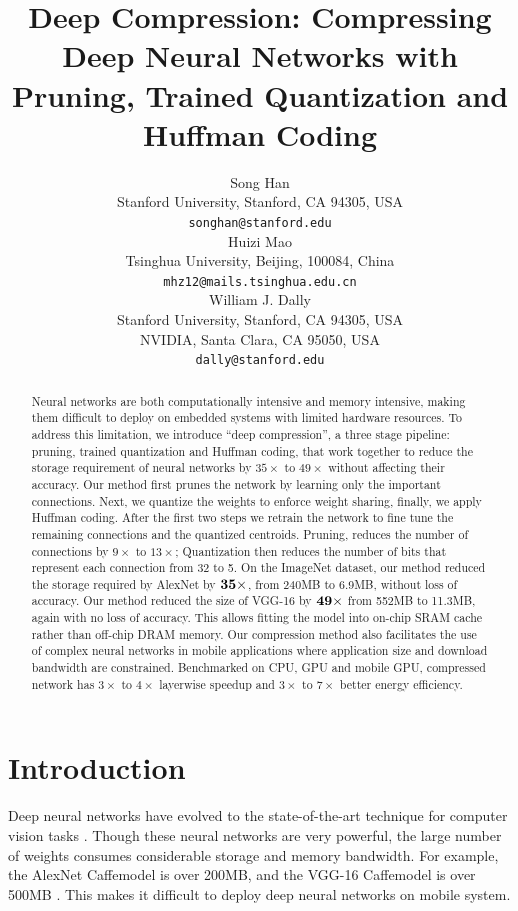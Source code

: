 \documentclass{article} %
\title{Deep Compression: Compressing Deep Neural Networks with Pruning, Trained Quantization and Huffman Coding}
\author{Song Han \\
Stanford University, Stanford, CA 94305, USA \\
\texttt{songhan@stanford.edu} \\
\AND
Huizi Mao \\
Tsinghua University, Beijing, 100084, China \\
\texttt{mhz12@mails.tsinghua.edu.cn} \\
\AND
William J. Dally \\
Stanford University, Stanford, CA 94305, USA \\
NVIDIA, Santa Clara, CA 95050, USA\\
\texttt{dally@stanford.edu} \\}
\begin{document}
\maketitle


\begin{abstract}
Neural networks are both computationally intensive and memory intensive, making them difficult to deploy on embedded systems with limited hardware resources. To address this limitation, we introduce ``deep compression'', a three stage pipeline: pruning, trained quantization and Huffman coding, that work together to reduce the storage requirement of neural networks by $35\times$ to $49\times$ without affecting their accuracy. 
Our method first prunes the network by learning only the important connections. Next, we quantize the weights to enforce weight sharing, finally, we apply Huffman coding. After the first two steps we retrain the network to fine tune the remaining connections and the quantized centroids. Pruning, reduces the number of connections by $9\times$ to $13\times$;   Quantization then reduces the number of bits that represent each connection from 32 to 5.  On the ImageNet dataset, our method reduced the storage required by AlexNet by $\bf{35\times}$, from 240MB to 6.9MB, without loss of accuracy. Our method reduced the size of VGG-16 by $\bf{49\times}$ from 552MB to 11.3MB, again with no loss of accuracy. This allows fitting the model into on-chip SRAM cache rather than off-chip DRAM memory. Our compression method also facilitates the use of complex neural networks in mobile applications where application size and download bandwidth are constrained. Benchmarked on CPU, GPU and mobile GPU, compressed network has $3\times$ to $4\times$ layerwise speedup and $3\times$ to $7\times$ better energy efficiency.

\end{abstract}



\section{Introduction}


Deep neural networks have evolved to the state-of-the-art technique for computer vision tasks \citep{hinton12}\citep{simonyan2014very}. Though these neural networks are very powerful, the large number of weights consumes considerable storage and memory bandwidth. For example, the AlexNet Caffemodel is over 200MB, and the VGG-16 Caffemodel is over 500MB \citep{caffemodel}. This makes it difficult to deploy deep neural networks on mobile system.
\end{document}
